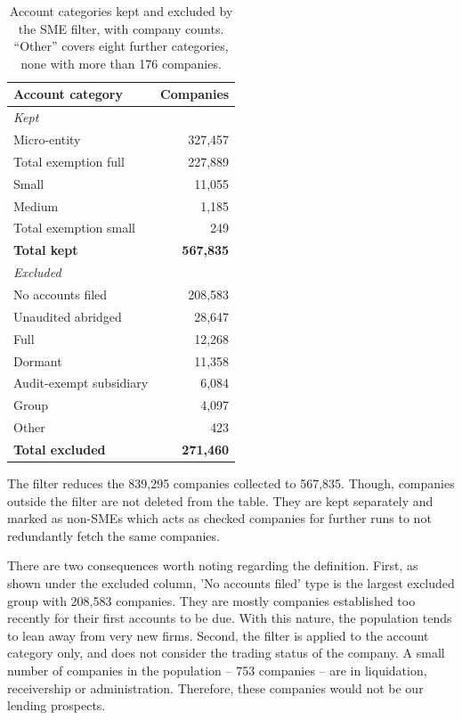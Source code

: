 \documentclass[ %
                    author={Natchalin Iwsakul \\[0.4em] Inkaphol Siriwongwattana \\[0.4em] Tanaphan Kummaraphat \\[0.6em] Patorn Srisupap},,
                supervisor={Fernando Moreno-Pino},
                    degree={MSc},
                     title={Propensity Modelling for SME Commercial Lending Using Open Public Data
},
                  subtitle={Companies House and GDELT as predictors of first-time borrowing},
                      type={},
                      year={2026}]{dissertation}
\begin{document}
\begin{table}[H]
\centering
\begin{tabular}{lr}
\toprule
Account category & Companies \\
\midrule
\multicolumn{2}{l}{\itshape Kept} \\
Micro-entity             & 327,457 \\
Total exemption full     & 227,889 \\
Small                    &  11,055 \\
Medium                   &   1,185 \\
Total exemption small    &     249 \\
\addlinespace
\textbf{Total kept}      & \textbf{567,835} \\
\midrule
\multicolumn{2}{l}{\itshape Excluded} \\
No accounts filed        & 208,583 \\
Unaudited abridged       &  28,647 \\
Full                     &  12,268 \\
Dormant                  &  11,358 \\
Audit-exempt subsidiary  &   6,084 \\
Group                    &   4,097 \\
Other                    &     423 \\
\addlinespace
\textbf{Total excluded}  & \textbf{271,460} \\
\bottomrule
\end{tabular}
\caption[The SME filter]{Account categories kept and excluded by the SME
filter, with company counts. ``Other'' covers eight further categories, none
with more than 176 companies.}
\label{tab:acctypes}
\end{table}

The filter reduces the 839,295 companies collected to 567,835. Though, companies outside the filter are not deleted from the table. They are kept separately and marked as non-SMEs which acts as checked companies for further runs to not redundantly fetch the same companies.

There are two consequences worth noting regarding the definition. First, as shown under the excluded column, 'No accounts filed' type is the largest excluded group with 208,583 companies. They are mostly companies established too recently for their first accounts to be due. With this nature, the population tends to lean away from very new firms. Second, the filter is applied to the account category only, and does not consider the trading status of the company. A small number of companies in the population -- 753 companies -- are in liquidation, receivership or administration. Therefore, these companies would not be our lending prospects.
\end{document}
